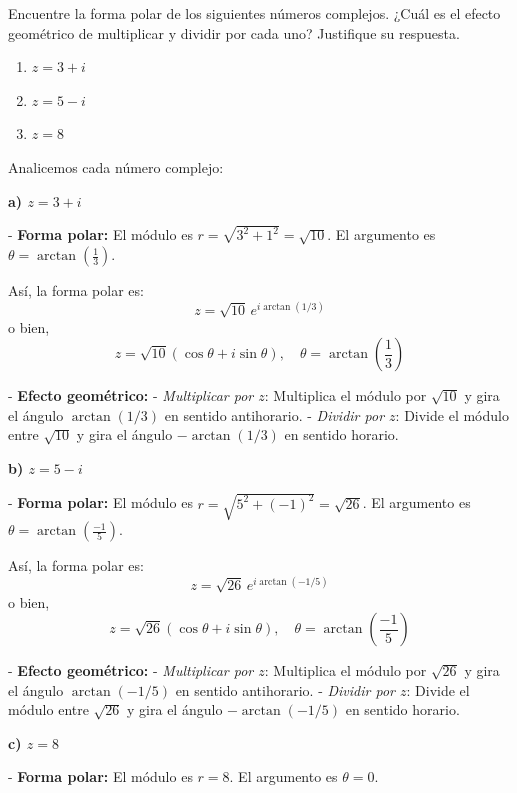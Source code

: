 \begin{prob} 
Encuentre la forma polar de los siguientes números complejos. ¿Cuál es el efecto geométrico de multiplicar y dividir por cada uno? Justifique su respuesta.
\begin{multicols}{3}
\begin{enumerate}[$a)$]
\item $z=3+i$
\item $z=5-i$
\item $z=8$
\end{enumerate}
\end{multicols}
\begin{myproof}
Analicemos cada número complejo:

\textbf{a) $z = 3 + i$}

- \textbf{Forma polar:}  
  El módulo es $r = \sqrt{3^2 + 1^2} = \sqrt{10}$.  
  El argumento es $\theta = \arctan\left(\frac{1}{3}\right)$.

  Así, la forma polar es:
  \[
  z = \sqrt{10} \, e^{i\arctan(1/3)}
  \]
  o bien,
  \[
  z = \sqrt{10} \left( \cos\theta + i\sin\theta \right), \quad \theta = \arctan\left(\frac{1}{3}\right)
  \]

- \textbf{Efecto geométrico:}
  - \textit{Multiplicar por $z$}: Multiplica el módulo por $\sqrt{10}$ y gira el ángulo $\arctan(1/3)$ en sentido antihorario.
  - \textit{Dividir por $z$}: Divide el módulo entre $\sqrt{10}$ y gira el ángulo $-\arctan(1/3)$ en sentido horario.

\vspace{1em}

\textbf{b) $z = 5 - i$}

- \textbf{Forma polar:}  
  El módulo es $r = \sqrt{5^2 + (-1)^2} = \sqrt{26}$.  
  El argumento es $\theta = \arctan\left(\frac{-1}{5}\right)$.

  Así, la forma polar es:
  \[
  z = \sqrt{26} \, e^{i\arctan(-1/5)}
  \]
  o bien,
  \[
  z = \sqrt{26} \left( \cos\theta + i\sin\theta \right), \quad \theta = \arctan\left(\frac{-1}{5}\right)
  \]

- \textbf{Efecto geométrico:}
  - \textit{Multiplicar por $z$}: Multiplica el módulo por $\sqrt{26}$ y gira el ángulo $\arctan(-1/5)$ en sentido antihorario.
  - \textit{Dividir por $z$}: Divide el módulo entre $\sqrt{26}$ y gira el ángulo $-\arctan(-1/5)$ en sentido horario.

\vspace{1em}

\textbf{c) $z = 8$}

- \textbf{Forma polar:}  
  El módulo es $r = 8$.  
  El argumento es $\theta = 0$.


\end{myproof}
\end{prob}
